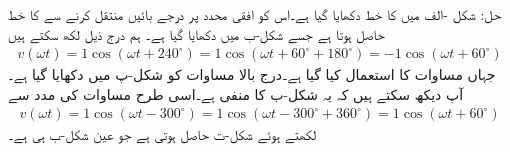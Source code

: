 حل: شکل -الف میں  کا خط دکھایا گیا ہے۔اس کو افقی محدد پر  درجے  بائیں منتقل کرنے سے  کا خط حاصل ہوتا ہے جسے شکل-ب میں دکھایا گیا ہے۔ ہم درج ذیل لکھ سکتے ہیں
\begin{align*}
v(\omega t)=1\cos (\omega t +240^{\circ})=1\cos (\omega t +60^{\circ}+180^{\circ})=-1\cos (\omega t +60^{\circ})
\end{align*}
جہاں مساوات  کا استعمال کیا گیا ہے۔درج بالا مساوات کو شکل-پ میں دکھایا گیا ہے۔آپ دیکھ سکتے ہیں کہ یہ شکل-ب کا منفی ہے۔اسی طرح مساوات  کی مدد سے
\begin{align*}
v(\omega t)=1\cos(\omega t-300^{\circ})=1\cos(\omega t-300^{\circ}+360^{\circ})=1\cos(\omega t+60^{\circ})
\end{align*}
لکھتے ہوئے شکل-ت حاصل ہوتی ہے جو عین شکل-ب ہی ہے۔
